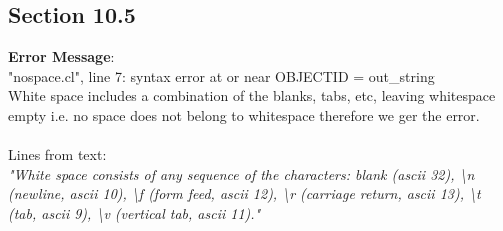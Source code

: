 \documentclass[12pt]{article}
\begin{document}
\subsection{Section 10.5}
\textbf{Error Message}:\\
"nospace.cl", line 7: syntax error at or near OBJECTID = out\_string\\
White space includes a combination of the blanks, tabs, etc, leaving whitespace empty i.e. no space does not belong to whitespace therefore we ger the error.\\\\
Lines from text:\\
\textit{"White space consists of any sequence of the characters: blank (ascii 32), \textbackslash n (newline, ascii 10), \textbackslash f (form
feed, ascii 12), \textbackslash r (carriage return, ascii 13), \textbackslash t (tab, ascii 9), \textbackslash v (vertical tab, ascii 11)."}
\end{document}
